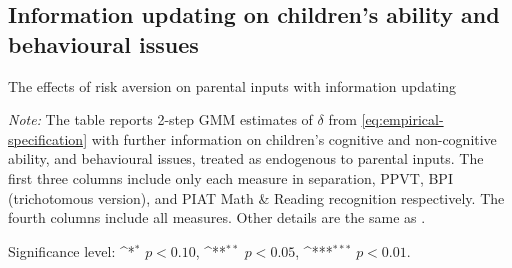 \documentclass[emulatestandardclasses, 10pt, abstract = true]{scrartcl}
\begin{document}
\pagebreak
\subsection{Information updating on children's ability and behavioural issues}

\begin{table}[!htbp]
	\def\sym#1{\ifmmode^{#1}\else\(^{#1}\)\fi}
	\setlength{\extrarowheight}{0.3em} \centering
	\caption{The effects of risk aversion on parental inputs with information updating}
	\begin{threeparttable}
		
		\begin{tablenotes}[flushleft]\footnotesize
			\item \textit{Note:} The table reports 2-step GMM estimates of $\delta$ from \eqref{eq:empirical-specification} with further information on children's cognitive and non-cognitive ability, and behavioural issues, treated as endogenous to parental inputs. The first three columns include only each measure in separation, PPVT, BPI (trichotomous version), and PIAT Math \& Reading recognition respectively. The fourth columns include all measures. Other details are the same as . 
			\item Significance level: \sym{*} \(p<0.10\), \sym{**} \(p<0.05\), \sym{***} \(p<0.01\).\\
		\end{tablenotes}
	\end{threeparttable}
	\label{table:robust-2}
\end{table}
\end{document}
